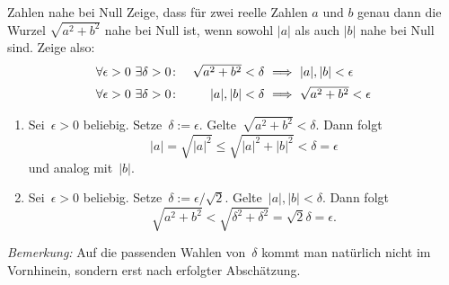 \documentclass{algblatt}
\begin{document}
\begin{aufgabe}{Zahlen nahe bei Null}
Zeige, dass für zwei reelle Zahlen $a$ und $b$ genau dann die Wurzel
$\sqrt{a^2 + b^2}$ nahe bei Null ist, wenn sowohl $|a|$ als auch $|b|$
nahe bei Null sind. Zeige also:
\[ \begin{array}{@{}rr@{\ }c@{\ }l@{}}
  \forall \epsilon > 0\ \exists \delta > 0 \colon &
        \sqrt{a^2 + b^2} < \delta & \implies & |a|, |b| < \epsilon \\[0.5em]
    \forall \epsilon > 0\ \exists \delta > 0 \colon &
        |a|, |b| < \delta & \implies & \sqrt{a^2  + b^2} < \epsilon
\end{array} \]
\vspace{-1.5em}
\begin{loesung}
\begin{enumerate}
\item Sei~$\epsilon > 0$ beliebig. Setze~$\delta := \epsilon$. Gelte~$\sqrt{a^2
+ b^2} < \delta$. Dann folgt
\[ |a| = \sqrt{|a|^2} \leq \sqrt{|a|^2 + |b|^2} < \delta = \epsilon \]
und analog mit~$|b|$.
\item Sei~$\epsilon > 0$ beliebig. Setze~$\delta := \epsilon/\sqrt{2}$.
Gelte~$|a|,|b| < \delta$. Dann folgt
\[ \sqrt{a^2 + b^2} < \sqrt{\delta^2 + \delta^2} = \sqrt{2} \delta = \epsilon.
\]
\end{enumerate}
\emph{Bemerkung:} Auf die passenden Wahlen von~$\delta$ kommt man natürlich
nicht im Vornhinein, sondern erst nach erfolgter Abschätzung.
\end{loesung}
\end{aufgabe}
\end{document}
